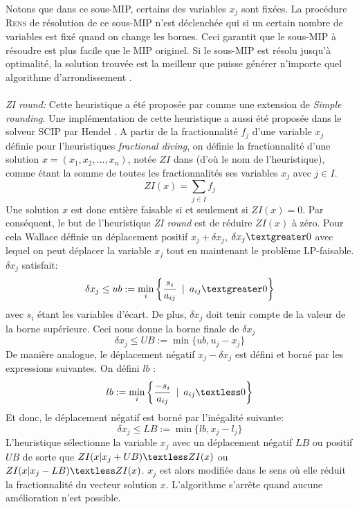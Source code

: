 \documentclass[12pt,a4paper,oneside]{book}
\theoremstyle{definition}
\DeclareMathOperator*{\mini}{min}
\begin{document}
	Notons que dans ce sous-MIP, certains des variables $x_j$ sont fixées. La procédure \textsc{Rens} de résolution de ce sous-MIP n'est déclenchée qui si un certain nombre de variables est fixé quand on change les bornes. Ceci garantit que le sous-MIP à résoudre est plus facile que le MIP originel. Si le sous-MIP est résolu jusqu'à optimalité, la solution trouvée est la meilleur que puisse générer n'importe quel algorithme d'arrondissement \cite{berthold2006}.
	
	\paragraph{}
	\textit{ZI round:} Cette heuristique a été proposée par \cite{Wallace2009} comme une extension de \textit{Simple rounding}. Une implémentation de cette heuristique a aussi été proposée dans le solveur SCIP par Hendel \cite{Hendel2011}. 
	A partir de la fractionnalité $f_j$ d'une variable $x_j$ définie pour l'heuristiques \textit{fractional diving}, on définie la fractionnalité d'une solution $x = (x_1, x_2, ..., x_n)$, notée $ZI$ dans \cite{Wallace2009} (d'où le nom de l'heuristique), comme étant la somme de toutes les fractionnalités ses variables $x_j$ avec $j \in I$.
	\[
		ZI(x) = \sum_{j \in I} f_j
	\]
	Une solution $x$ est donc entière faisable si et seulement si $ZI(x) = 0$. Par conséquent, le but de l'heuristique \textit{ZI round} est de réduire $ZI(x)$ à zéro.
	Pour cela Wallace définie un déplacement positif  $x_j + \delta x_j$, $\delta x_j \textgreater 0$ avec lequel on peut déplacer la variable $x_j$ tout en maintenant le problème LP-faisable. $\delta x_j$ satisfait:
	\[
		\delta x_j \leq ub := \mini_{i} \bigg\{\frac{s_i}{a_{ij}} \hspace{5pt} | \hspace{5pt} a_{ij} \textgreater 0 \bigg\}
	\]
	avec $s_i$ étant les variables d'écart. 
	De plus, $\delta x_j $ doit tenir compte de la valeur de la borne supérieure. Ceci nous donne la borne finale de $\delta x_j$
	\[
		\delta x_j \leq UB := \min\{ub,u_j - x_j\}
	\]
	De manière analogue, le déplacement négatif $x_j - \delta x_j $ est défini et borné par les expressions suivantes.
	On défini $lb$ :
	\[
		lb := \mini_{i} \bigg\{\frac{- s_i}{a_{ij}} \hspace{5pt} | \hspace{5pt} a_{ij} \textless 0 \bigg\}
	\]
	Et donc, le déplacement négatif est borné par l'inégalité suivante:
	\[
		\delta x_j \leq LB := \min\{lb,x_j - l_j\}
	\]
	L'heuristique sélectionne la variable $x_j$ avec un déplacement négatif $LB$ ou positif $UB$ de sorte que $ZI(x | x_j + UB) \textless ZI(x)  $  ou $ZI(x | x_j - LB) \textless ZI(x)$. $x_j$ est alors modifiée dans le sens où elle réduit la fractionnalité du vecteur solution $x$. L'algorithme s'arrête quand aucune amélioration n'est possible. 
	
\end{document}
